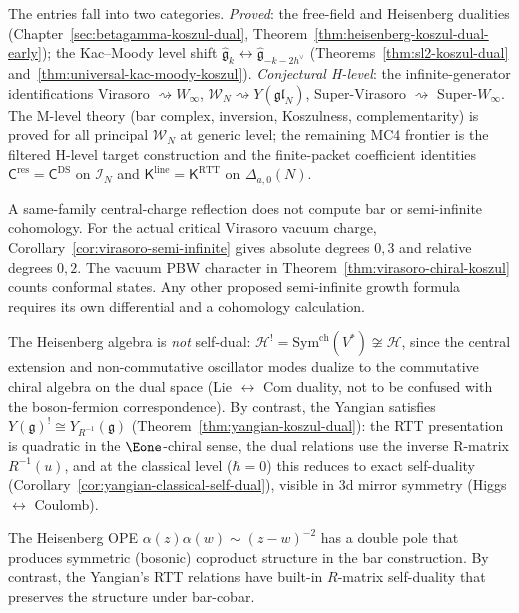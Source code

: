 \begin{remark}\label{rem:koszul-table-status}
The entries fall into two categories.
\emph{Proved}: the free-field and Heisenberg dualities (Chapter~\ref{sec:betagamma-koszul-dual}, Theorem~\ref{thm:heisenberg-koszul-dual-early}); the Kac--Moody level shift $\widehat{\mathfrak{g}}_k \leftrightarrow \widehat{\mathfrak{g}}_{-k-2h^\vee}$ (Theorems~\ref{thm:sl2-koszul-dual} and~\ref{thm:universal-kac-moody-koszul}).
\emph{Conjectural H-level}: the infinite-generator identifications Virasoro $\rightsquigarrow W_\infty$, $\mathcal{W}_N \rightsquigarrow Y(\mathfrak{gl}_N)$, Super-Virasoro $\rightsquigarrow$ Super-$W_\infty$.  The M-level theory (bar complex, inversion, Koszulness, complementarity) is proved for all principal $\mathcal{W}_N$ at generic level; the remaining MC4 frontier is the filtered H-level target construction and the finite-packet coefficient identities $\mathsf{C}^{\mathrm{res}} = \mathsf{C}^{\mathrm{DS}}$ on $\mathcal{I}_N$ and $\mathsf{K}^{\mathrm{line}} = \mathsf{K}^{\mathrm{RTT}}$ on $\Delta_{a,0}(N)$.
\end{remark}

\begin{remark}
A same-family central-charge reflection does not compute bar or semi-infinite cohomology.
For the actual critical Virasoro vacuum charge, Corollary~\ref{cor:virasoro-semi-infinite} gives absolute degrees $0,3$ and relative degrees $0,2$.
The vacuum PBW character in Theorem~\ref{thm:virasoro-chiral-koszul} counts conformal states.
Any other proposed semi-infinite growth formula requires its own differential and a cohomology calculation.
\end{remark}

\begin{remark}\label{rem:heisenberg-yangian-contrast}
The Heisenberg algebra is \emph{not} self-dual: $\mathcal{H}^! = \mathrm{Sym}^{\mathrm{ch}}(V^*) \not\cong \mathcal{H}$, since the central extension and non-commutative oscillator modes dualize to the commutative chiral algebra on the dual space (Lie $\leftrightarrow$ Com duality, not to be confused with the boson-fermion correspondence).  By contrast, the Yangian satisfies $Y(\mathfrak{g})^! \cong Y_{R^{-1}}(\mathfrak{g})$ (Theorem~\ref{thm:yangian-koszul-dual}): the RTT presentation is quadratic in the $\Eone$-chiral sense, the dual relations use the inverse R-matrix $R^{-1}(u)$, and at the classical level ($\hbar = 0$) this reduces to exact self-duality (Corollary~\ref{cor:yangian-classical-self-dual}), visible in 3d mirror symmetry (Higgs $\leftrightarrow$ Coulomb).

The Heisenberg OPE $\alpha(z)\alpha(w) \sim (z-w)^{-2}$ has a double pole that produces symmetric (bosonic) coproduct structure in the bar construction. By contrast, the Yangian's RTT relations have built-in $R$-matrix self-duality that preserves the structure under bar-cobar.
\end{remark}

